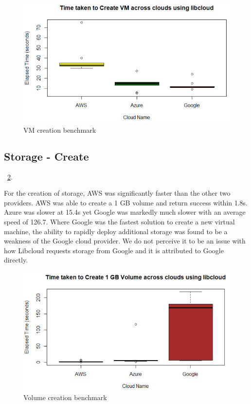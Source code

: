 \begin{figure}[!ht]
  \centering
  \includegraphics[width=\columnwidth]{images/CreateVM.png}
  \caption{VM creation benchmark}\label{F:vm-create}
\end{figure}

\subsection{Storage - Create}~\ref{F:vm-volume}.

For the creation of storage, AWS was significantly faster than the other two providers. AWS was able to create a 1 GB volume and return success within 1.8s. Azure was slower at 15.4s yet Google was markedly much slower with an average speed of 126.7. Where Google was the fastest solution to create a new virtual machine, the ability to rapidly deploy additional storage was found to be a weakness of the Google cloud provider. We do not perceive it to be an issue with how Libcloud requests storage from Google and it is attributed to Google directly.

\begin{figure}[!ht]
  \centering
  \includegraphics[width=\columnwidth]{images/Create1GBVol.png}
  \caption{Volume creation benchmark}\label{F:vm-volume}
\end{figure}

